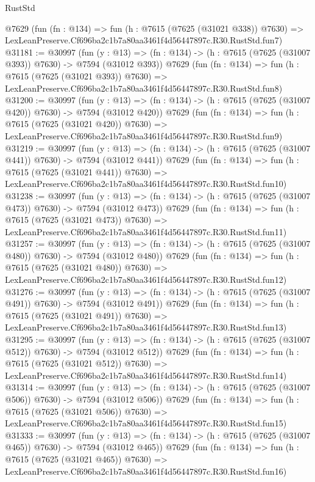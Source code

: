 \begin{lexlean}{RustStd}
\begin{coremodule}
    @7629
    (fun (fn : @134) =>
    fun (h : @7615 (@7625 (@31021 @338)) @7630) =>
    LexLeanPreserve.Cf696ba2c1b7a80aa3461f4d56447897c.R30.RustStd.fun7)
@31181 := @30997
    (fun (y : @13) => (fn : @134) -> (h : @7615 (@7625 (@31007 @393)) @7630) -> @7594 (@31012 @393))
    @7629
    (fun (fn : @134) =>
    fun (h : @7615 (@7625 (@31021 @393)) @7630) =>
    LexLeanPreserve.Cf696ba2c1b7a80aa3461f4d56447897c.R30.RustStd.fun8)
@31200 := @30997
    (fun (y : @13) => (fn : @134) -> (h : @7615 (@7625 (@31007 @420)) @7630) -> @7594 (@31012 @420))
    @7629
    (fun (fn : @134) =>
    fun (h : @7615 (@7625 (@31021 @420)) @7630) =>
    LexLeanPreserve.Cf696ba2c1b7a80aa3461f4d56447897c.R30.RustStd.fun9)
@31219 := @30997
    (fun (y : @13) => (fn : @134) -> (h : @7615 (@7625 (@31007 @441)) @7630) -> @7594 (@31012 @441))
    @7629
    (fun (fn : @134) =>
    fun (h : @7615 (@7625 (@31021 @441)) @7630) =>
    LexLeanPreserve.Cf696ba2c1b7a80aa3461f4d56447897c.R30.RustStd.fun10)
@31238 := @30997
    (fun (y : @13) => (fn : @134) -> (h : @7615 (@7625 (@31007 @473)) @7630) -> @7594 (@31012 @473))
    @7629
    (fun (fn : @134) =>
    fun (h : @7615 (@7625 (@31021 @473)) @7630) =>
    LexLeanPreserve.Cf696ba2c1b7a80aa3461f4d56447897c.R30.RustStd.fun11)
@31257 := @30997
    (fun (y : @13) => (fn : @134) -> (h : @7615 (@7625 (@31007 @480)) @7630) -> @7594 (@31012 @480))
    @7629
    (fun (fn : @134) =>
    fun (h : @7615 (@7625 (@31021 @480)) @7630) =>
    LexLeanPreserve.Cf696ba2c1b7a80aa3461f4d56447897c.R30.RustStd.fun12)
@31276 := @30997
    (fun (y : @13) => (fn : @134) -> (h : @7615 (@7625 (@31007 @491)) @7630) -> @7594 (@31012 @491))
    @7629
    (fun (fn : @134) =>
    fun (h : @7615 (@7625 (@31021 @491)) @7630) =>
    LexLeanPreserve.Cf696ba2c1b7a80aa3461f4d56447897c.R30.RustStd.fun13)
@31295 := @30997
    (fun (y : @13) => (fn : @134) -> (h : @7615 (@7625 (@31007 @512)) @7630) -> @7594 (@31012 @512))
    @7629
    (fun (fn : @134) =>
    fun (h : @7615 (@7625 (@31021 @512)) @7630) =>
    LexLeanPreserve.Cf696ba2c1b7a80aa3461f4d56447897c.R30.RustStd.fun14)
@31314 := @30997
    (fun (y : @13) => (fn : @134) -> (h : @7615 (@7625 (@31007 @506)) @7630) -> @7594 (@31012 @506))
    @7629
    (fun (fn : @134) =>
    fun (h : @7615 (@7625 (@31021 @506)) @7630) =>
    LexLeanPreserve.Cf696ba2c1b7a80aa3461f4d56447897c.R30.RustStd.fun15)
@31333 := @30997
    (fun (y : @13) => (fn : @134) -> (h : @7615 (@7625 (@31007 @465)) @7630) -> @7594 (@31012 @465))
    @7629
    (fun (fn : @134) =>
    fun (h : @7615 (@7625 (@31021 @465)) @7630) =>
    LexLeanPreserve.Cf696ba2c1b7a80aa3461f4d56447897c.R30.RustStd.fun16)

\end{coremodule}
\end{lexlean}
